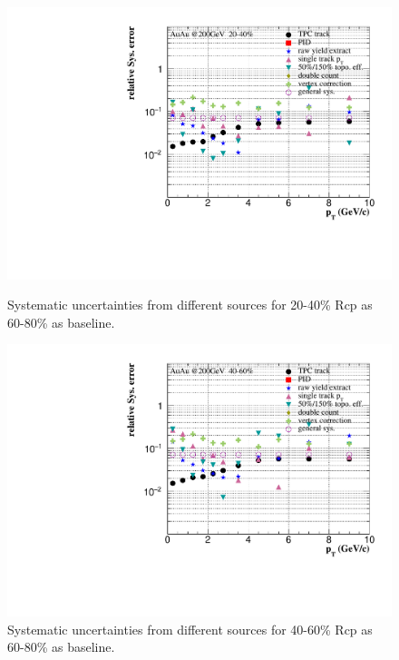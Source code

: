 \begin{figure}[htbp]
\begin{minipage}[htbp]{0.47\linewidth}
\centering
\includegraphics[width=1.0\textwidth,angle=0]{figure/Run14_D0HFT/sysErr_20_40_Rcp1.pdf}
\caption{ Systematic uncertainties from different sources for 20-40\% Rcp as 60-80\% as baseline. \label{sysErr_20_40_Rcp1}}
\end{minipage}
\hfill
\begin{minipage}[htbp]{0.47\linewidth}
\centering
\includegraphics[width=1.0\textwidth,angle=0]{figure/Run14_D0HFT/sysErr_40_60_Rcp1.pdf} 
\caption{ Systematic uncertainties from different sources for 40-60\% Rcp as 60-80\% as baseline. \label{sysErr_40_60_Rcp1}}
\end{minipage}
\end{figure}



